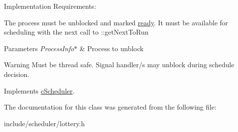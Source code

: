 \-Implementation \-Requirements\-: \begin{DoxyItemize}
\item \-The process must be unblocked and marked \hyperlink{process_8h_a2c72cb00af5be695c1f898162350821fa3d4001ca586c857718be397374082d76}{ready}. \-It must be available for scheduling with the next call to \-::get\-Next\-To\-Run\end{DoxyItemize}

\begin{DoxyParams}{\-Parameters}
{\em \-Process\-Info$\ast$} & \-Process to unblock\\
\hline
\end{DoxyParams}
\begin{DoxyWarning}{\-Warning}
\-Must be thread safe. \-Signal handler/s may unblock during schedule decision. 
\end{DoxyWarning}


\-Implements \hyperlink{classcScheduler_a81fe2e5e5e2334e36db1cbf491e3fa57}{c\-Scheduler}.



\-The documentation for this class was generated from the following file\-:\begin{DoxyCompactItemize}
\item 
include/scheduler/lottery.\-h\end{DoxyCompactItemize}
